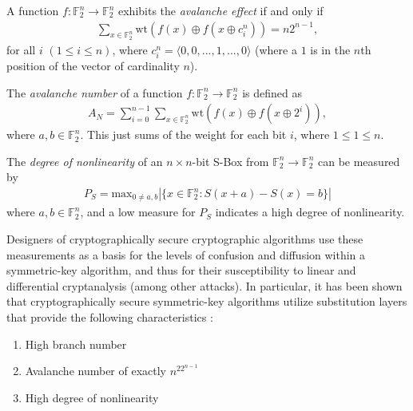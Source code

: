 \documentclass[11pt]{article}
\newcommand{\field}[1]{\mathbb{#1}} %
\begin{document}
\begin{define}
A function $f : \field{F}_2^n \to \field{F}_2^n$ exhibits the \emph{avalanche effect} if and only if 
\begin{eqnarray}
\sum_{x \in \field{F}_2^n} \text{wt}(f(x) \oplus f(x \oplus c_{i}^{n})) = n2^{n-1},
\end{eqnarray}
for all $i$ $(1 \leq i \leq n)$, where $c_{i}^{n} = \langle 0, 0, ..., 1, ..., 0 \rangle$ (where a $1$ is in the $n$th position of the vector of cardinality $n$).
\end{define}

\begin{define}
The \emph{avalanche number} of a function $f : \field{F}_2^n \to \field{F}_2^n$ is defined as
\begin{eqnarray}
A_N = \sum_{i = 0}^{n - 1}\sum_{x \in \field{F}_2^n} \text{wt}(f(x) \oplus f(x \oplus 2^{i})),
\end{eqnarray}
where $a, b \in \field{F}_2^n$. This just sums of the weight for each bit $i$, where $1 \leq 1 \leq n$.
\end{define}

\begin{define}
The \emph{degree of nonlinearity} of an $n \times n$-bit S-Box from $\field{F}_2^n \to \field{F}_2^n$ can be measured by
\begin{eqnarray}
	P_S = \text{max}_{0 \not= a, b}|\{x \in \field{F}_2^n : S(x + a) - S(x) = b\}|
\end{eqnarray}
where $a, b \in \field{F}_2^n$, and a low measure for $P_S$ indicates a high degree of nonlinearity.
\end{define}

Designers of cryptographically secure cryptographic algorithms use these measurements as a basis for the levels of confusion and diffusion within a symmetric-key algorithm, and thus for their susceptibility to linear and differential cryptanalysis (among other attacks). In particular, it has been shown that cryptographically secure symmetric-key algorithms utilize substitution layers that provide the following characteristics \cite{Kim90astudy}:
\begin{enumerate}
	\item High branch number
	\item Avalanche number of exactly $n^22^{n-1}$
	\item High degree of nonlinearity
\end{enumerate}
\end{document}
